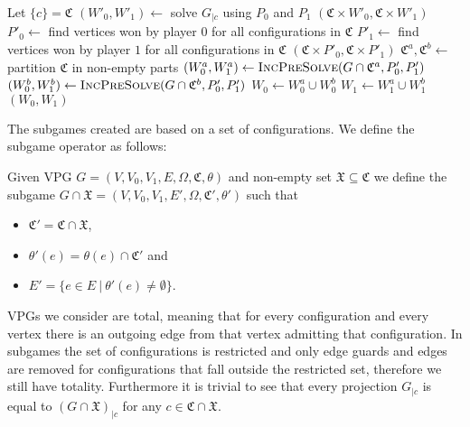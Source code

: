 \begin{algorithm}
	\caption{$\textsc{IncPreSolve}(\textit{VPG } G = (V,V_0,V_1, E, \Omega, \mathfrak{C}, \theta), P_0,P_1)$}\label{alg_IncPreSolveBasic}
	\begin{algorithmic}[1]
		\State Let $\{c\} = \mathfrak{C}$
		\State $(W'_0,W'_1) \gets $ solve $G_{|c}$ using $P_0$ and $P_1$
		\State \Return $(\mathfrak{C} \times W'_0, \mathfrak{C} \times W'_1)$
		\EndIf
		\State $P'_0 \gets$ find vertices won by player $0$ for all configurations in $\mathfrak{C}$
		\State $P'_1 \gets$ find vertices won by player $1$ for all configurations in $\mathfrak{C}$
		\State \Return $(\mathfrak{C} \times P'_0, \mathfrak{C} \times P'_1)$
		\EndIf
		\State $\mathfrak{C}^a, \mathfrak{C}^b \gets $ partition $\mathfrak{C}$ in non-empty parts
		\State $(W_0^a, W_1^a) \gets \textsc{IncPreSolve}(G \cap \mathfrak{C}^a, P'_0,P'_1)$
		\State $(W_0^b, W_1^b) \gets \textsc{IncPreSolve}(G \cap \mathfrak{C}^b, P'_0,P'_1)$
		\State $W_0 \gets W_0^a \cup W_0^b$
		\State $W_1 \gets W_1^a \cup W_1^b$
		\State \Return $(W_0,W_1)$
	\end{algorithmic}
\end{algorithm}
The subgames created are based on a set of configurations. We define the subgame operator as follows:
\begin{definition}
	Given VPG $G = (V,V_0,V_1,E,\Omega,\mathfrak{C},\theta)$ and non-empty set $\mathfrak{X} \subseteq \mathfrak{C}$ we define the subgame $G \cap \mathfrak{X} = (V,V_0,V_1,E',\Omega,\mathfrak{C}', \theta')$ such that
	\begin{itemize}
		\item $\mathfrak{C}' =\mathfrak{C} \cap \mathfrak{X}$,
		\item $\theta'(e) = \theta(e) \cap \mathfrak{C}'$ and
		\item $E' = \{ e \in E\ |\ \theta'(e) \neq \emptyset \}$.
	\end{itemize}
\end{definition}
VPGs we consider are total, meaning that for every configuration and every vertex there is an outgoing edge from that vertex admitting that configuration. In subgames the set of configurations is restricted and only edge guards and edges are removed for configurations that fall outside the restricted set, therefore we still have totality. Furthermore it is trivial to see that every projection $G_{|c}$ is equal to $(G \cap \mathfrak{X})_{|c}$ for any $c \in \mathfrak{C} \cap \mathfrak{X}$.

